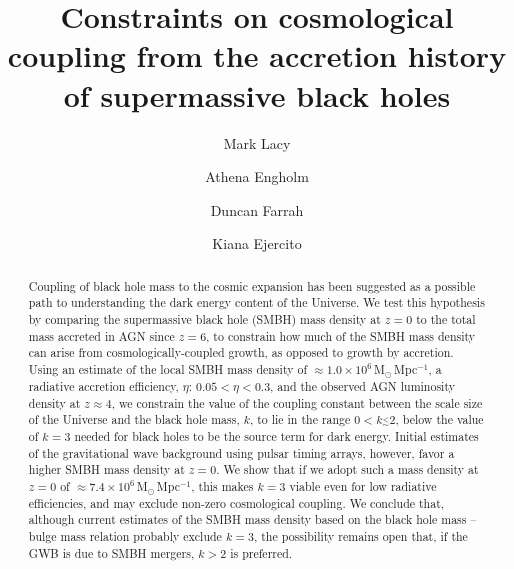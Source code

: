 \documentclass[twocolumn]{aastex631}
\begin{document}
\title{Constraints on cosmological coupling from the accretion history of supermassive black holes}


\author[0000-0002-3032-1783]{Mark Lacy}


\author[0000-0001-6970-7782]{Athena Engholm}


\author[0000-0003-1748-2010]{Duncan Farrah}


\author[0009-0002-6970-5247]{Kiana Ejercito}

\begin{abstract}
Coupling of black hole mass to the cosmic expansion has been suggested as a possible path to understanding the dark energy content of the Universe. We test this hypothesis by comparing the supermassive black hole (SMBH) mass density at $z=0$ to the total mass accreted in AGN since $z=6$, to constrain how much of the SMBH mass density can arise from cosmologically-coupled growth, as opposed to growth by accretion. Using an estimate of the local SMBH mass density of $\approx 1.0\times10^{6}\,$M$_{\odot}\,$Mpc$^{-1}$, a radiative accretion efficiency, $\eta$: $0.05<\eta<0.3$, and the observed AGN luminosity density at $z\approx 4$, we constrain the value of the  coupling constant between the scale size of the Universe and the black hole mass, $k$, to lie in the range $0<k\stackrel{<}{_{\sim}}2$, below the value of $k=3$ needed for black holes to be the source term for dark energy. 
Initial estimates of the gravitational wave background using pulsar timing arrays, however, favor a higher SMBH mass density at $z=0$. We show that if we adopt such a mass density at $z=0$ of $\approx 7.4\times 10^{6}\,$M$_{\odot}\,$Mpc$^{-1}$, this makes $k=3$ viable even for low radiative efficiencies, and may exclude non-zero cosmological coupling. We conclude that, although current estimates of the SMBH mass density based on the black hole mass -- bulge mass relation probably exclude $k=3$, the possibility remains open that, if the GWB is due to SMBH mergers, $k>2$ is preferred.

\end{abstract}
\end{document}
